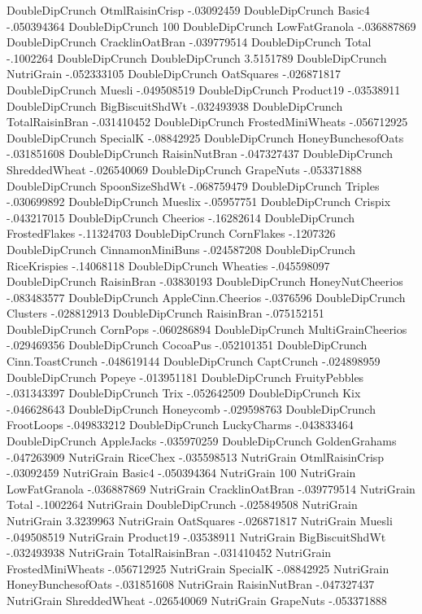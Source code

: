 DoubleDipCrunch	OtmlRaisinCrisp	-.03092459
DoubleDipCrunch	Basic4	-.050394364
DoubleDipCrunch	100%
DoubleDipCrunch	LowFatGranola	-.036887869
DoubleDipCrunch	CracklinOatBran	-.039779514
DoubleDipCrunch	Total	-.1002264
DoubleDipCrunch	DoubleDipCrunch	3.5151789
DoubleDipCrunch	NutriGrain	-.052333105
DoubleDipCrunch	OatSquares	-.026871817
DoubleDipCrunch	Muesli	-.049508519
DoubleDipCrunch	Product19	-.03538911
DoubleDipCrunch	BigBiscuitShdWt	-.032493938
DoubleDipCrunch	TotalRaisinBran	-.031410452
DoubleDipCrunch	FrostedMiniWheats	-.056712925
DoubleDipCrunch	SpecialK	-.08842925
DoubleDipCrunch	HoneyBunchesofOats	-.031851608
DoubleDipCrunch	RaisinNutBran	-.047327437
DoubleDipCrunch	ShreddedWheat	-.026540069
DoubleDipCrunch	GrapeNuts	-.053371888
DoubleDipCrunch	SpoonSizeShdWt	-.068759479
DoubleDipCrunch	Triples	-.030699892
DoubleDipCrunch	Mueslix	-.05957751
DoubleDipCrunch	Crispix	-.043217015
DoubleDipCrunch	Cheerios	-.16282614
DoubleDipCrunch	FrostedFlakes	-.11324703
DoubleDipCrunch	CornFlakes	-.1207326
DoubleDipCrunch	CinnamonMiniBuns	-.024587208
DoubleDipCrunch	RiceKrispies	-.14068118
DoubleDipCrunch	Wheaties	-.045598097
DoubleDipCrunch	RaisinBran	-.03830193
DoubleDipCrunch	HoneyNutCheerios	-.083483577
DoubleDipCrunch	AppleCinn.Cheerios	-.0376596
DoubleDipCrunch	Clusters	-.028812913
DoubleDipCrunch	RaisinBran	-.075152151
DoubleDipCrunch	CornPops	-.060286894
DoubleDipCrunch	MultiGrainCheerios	-.029469356
DoubleDipCrunch	CocoaPus	-.052101351
DoubleDipCrunch	Cinn.ToastCrunch	-.048619144
DoubleDipCrunch	CaptCrunch	-.024898959
DoubleDipCrunch	Popeye	-.013951181
DoubleDipCrunch	FruityPebbles	-.031343397
DoubleDipCrunch	Trix	-.052642509
DoubleDipCrunch	Kix	-.046628643
DoubleDipCrunch	Honeycomb	-.029598763
DoubleDipCrunch	FrootLoops	-.049833212
DoubleDipCrunch	LuckyCharms	-.043833464
DoubleDipCrunch	AppleJacks	-.035970259
DoubleDipCrunch	GoldenGrahams	-.047263909
NutriGrain	RiceChex	-.035598513
NutriGrain	OtmlRaisinCrisp	-.03092459
NutriGrain	Basic4	-.050394364
NutriGrain	100%
NutriGrain	LowFatGranola	-.036887869
NutriGrain	CracklinOatBran	-.039779514
NutriGrain	Total	-.1002264
NutriGrain	DoubleDipCrunch	-.025849508
NutriGrain	NutriGrain	3.3239963
NutriGrain	OatSquares	-.026871817
NutriGrain	Muesli	-.049508519
NutriGrain	Product19	-.03538911
NutriGrain	BigBiscuitShdWt	-.032493938
NutriGrain	TotalRaisinBran	-.031410452
NutriGrain	FrostedMiniWheats	-.056712925
NutriGrain	SpecialK	-.08842925
NutriGrain	HoneyBunchesofOats	-.031851608
NutriGrain	RaisinNutBran	-.047327437
NutriGrain	ShreddedWheat	-.026540069
NutriGrain	GrapeNuts	-.053371888
